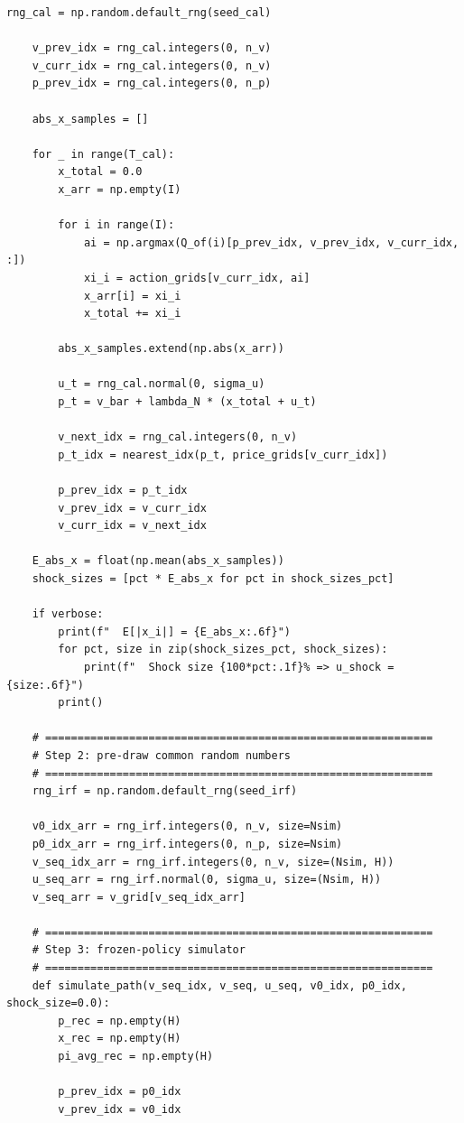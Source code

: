 \begin{lstlisting}[style=pythonstyle]
    rng_cal = np.random.default_rng(seed_cal)

    v_prev_idx = rng_cal.integers(0, n_v)
    v_curr_idx = rng_cal.integers(0, n_v)
    p_prev_idx = rng_cal.integers(0, n_p)

    abs_x_samples = []

    for _ in range(T_cal):
        x_total = 0.0
        x_arr = np.empty(I)

        for i in range(I):
            ai = np.argmax(Q_of(i)[p_prev_idx, v_prev_idx, v_curr_idx, :])
            xi_i = action_grids[v_curr_idx, ai]
            x_arr[i] = xi_i
            x_total += xi_i

        abs_x_samples.extend(np.abs(x_arr))

        u_t = rng_cal.normal(0, sigma_u)
        p_t = v_bar + lambda_N * (x_total + u_t)

        v_next_idx = rng_cal.integers(0, n_v)
        p_t_idx = nearest_idx(p_t, price_grids[v_curr_idx])

        p_prev_idx = p_t_idx
        v_prev_idx = v_curr_idx
        v_curr_idx = v_next_idx

    E_abs_x = float(np.mean(abs_x_samples))
    shock_sizes = [pct * E_abs_x for pct in shock_sizes_pct]

    if verbose:
        print(f"  E[|x_i|] = {E_abs_x:.6f}")
        for pct, size in zip(shock_sizes_pct, shock_sizes):
            print(f"  Shock size {100*pct:.1f}% => u_shock = {size:.6f}")
        print()

    # ============================================================
    # Step 2: pre-draw common random numbers
    # ============================================================
    rng_irf = np.random.default_rng(seed_irf)

    v0_idx_arr = rng_irf.integers(0, n_v, size=Nsim)
    p0_idx_arr = rng_irf.integers(0, n_p, size=Nsim)
    v_seq_idx_arr = rng_irf.integers(0, n_v, size=(Nsim, H))
    u_seq_arr = rng_irf.normal(0, sigma_u, size=(Nsim, H))
    v_seq_arr = v_grid[v_seq_idx_arr]

    # ============================================================
    # Step 3: frozen-policy simulator
    # ============================================================
    def simulate_path(v_seq_idx, v_seq, u_seq, v0_idx, p0_idx, shock_size=0.0):
        p_rec = np.empty(H)
        x_rec = np.empty(H)
        pi_avg_rec = np.empty(H)

        p_prev_idx = p0_idx
        v_prev_idx = v0_idx


\end{lstlisting}
